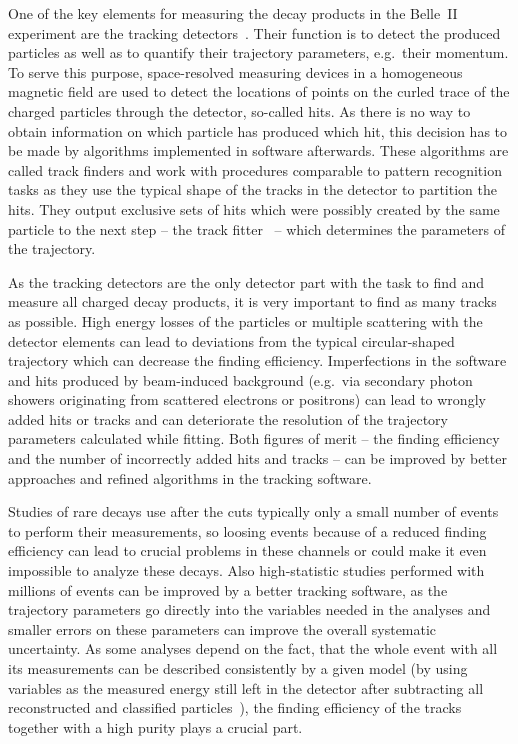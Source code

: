 
One of the key elements for measuring the decay products in the Belle~II experiment are the tracking detectors~\cite{tdr}. Their function is to detect the produced particles as well as to quantify their trajectory parameters, e.g.\ their momentum. To serve this purpose, space-resolved measuring devices in a homogeneous magnetic field are used to detect the locations of points on the curled trace of the charged particles through the detector, so-called hits. As there is no way to obtain information on which particle has produced which hit, this decision has to be made by algorithms implemented in software afterwards. These algorithms are called track finders and work with procedures comparable to pattern recognition tasks as they use the typical shape of the tracks in the detector to partition the hits. They output exclusive sets of hits which were possibly created by the same particle to the next step -- the track fitter~\cite{genfit} -- which determines the parameters of the trajectory.

As the tracking detectors are the only detector part with the task to find and measure all charged decay products, it is very important to find as many tracks as possible. High energy losses of the particles or multiple scattering with the detector elements can lead to deviations from the typical circular-shaped trajectory which can decrease the finding efficiency. Imperfections in the software and hits produced by beam-induced background (e.g.\ via secondary photon showers originating from scattered electrons or positrons) can lead to wrongly added hits or tracks and can deteriorate the resolution of the trajectory parameters calculated while fitting. Both figures of merit -- the finding efficiency and the number of incorrectly added hits and tracks -- can be improved by better approaches and refined algorithms in the tracking software.

Studies of rare decays use after the cuts typically only a small number of events~\cite{lutz} to perform their measurements, so loosing events because of a reduced finding efficiency can lead to crucial problems in these channels or could make it even impossible to analyze these decays. Also high-statistic studies performed with millions of events can be improved by a better tracking software, as the trajectory parameters go directly into the variables needed in the analyses and smaller errors on these parameters can improve the overall systematic uncertainty. As some analyses depend on the fact, that the whole event with all its measurements can be described consistently by a given model (by using variables as the measured energy still left in the detector after subtracting all reconstructed and classified particles~\cite{christian_phd}), the finding efficiency of the tracks together with a high purity plays a crucial part.

